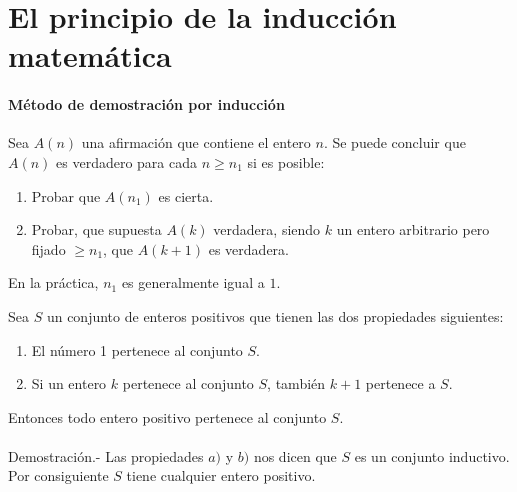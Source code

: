 \setcounter{chapter}{4}
\setcounter{section}{2}
\section{El principio de la inducción matemática}
\paragraph{Método de demostración por inducción}Sea $A(n)$ una afirmación que contiene el entero $n$. Se puede concluir que $A(n)$ es verdadero para cada $n\geq n_1$ si es posible:
\begin{enumerate}[\bfseries a)]
\item Probar que $A(n_1)$ es cierta.
\item Probar, que supuesta $A(k)$ verdadera, siendo $k$ un entero arbitrario pero fijado $\geq n_1$, que $A(k+1)$ es verdadera.\\
\end{enumerate}
En la práctica, $n_1$ es generalmente igual a $1$.

\begin{teo}
Sea $S$ un conjunto de enteros positivos que tienen las dos propiedades siguientes:
\begin{enumerate}[\bfseries a)]
\item El número 1 pertenece al conjunto $S$.
\item Si un entero $k$ pertenece al conjunto $S$, también $k+1$ pertenece a $S$.
\end{enumerate}
Entonces todo entero positivo pertenece al conjunto $S$.\\\\
Demostración.- \; Las propiedades $a)$ y $b)$ nos dicen que $S$ es un conjunto inductivo. Por consiguiente $S$ tiene cualquier entero positivo.\\\\ 
\end{teo}

